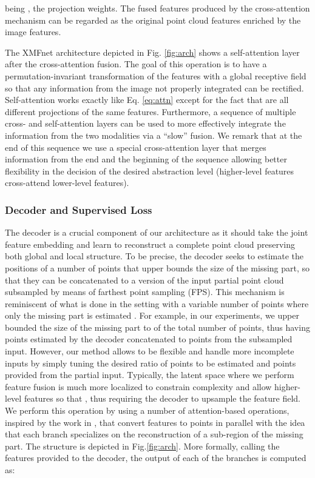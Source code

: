 \documentclass{article}
\begin{document}
being ,  the projection weights. The fused features  produced by the cross-attention mechanism can be regarded as the original point cloud features enriched by the image features.  

The XMFnet architecture depicted in Fig. \ref{fig:arch} shows a self-attention layer after the cross-attention fusion. The goal of this operation is to have a permutation-invariant transformation of the features with a global receptive field so that any information from the image not properly integrated can be rectified. Self-attention works exactly like Eq. \eqref{eq:attn} except for the fact that  are all different projections of the same features. Furthermore, a sequence of multiple cross- and self-attention layers can be used to more effectively integrate the information from the two modalities via a ``slow'' fusion. We remark that at the end of this sequence we use a special cross-attention layer that merges information from the end and the beginning of the sequence allowing better flexibility in the decision of the desired abstraction level (higher-level features cross-attend lower-level features). 



\subsubsection{Decoder and Supervised Loss}
The decoder is a crucial component of our architecture as it should take the joint feature embedding and learn to reconstruct a complete point cloud preserving both global and local structure. To be precise, the decoder seeks to estimate the positions of a number of points that upper bounds the size of the missing part, so that they can be concatenated to a version of the input partial point cloud subsampled by means of farthest point sampling (FPS). This mechanism is reminiscent of what is done in the setting with a variable number of points where only the missing part is estimated \cite{huang2020pf,alliegro2021denoise}. For example, in our experiments, we upper bounded the size of the missing part to  of the total number of points, thus having  points estimated by the decoder concatenated to  points from the subsampled input. However, our method allows to be flexible and handle more incomplete inputs by simply tuning the desired ratio of points to be estimated and points provided from the partial input.
Typically, the latent space where we perform feature fusion is much more localized to constrain complexity and allow higher-level features so that , thus requiring the decoder to upsample the feature field. We perform this operation by using a number of attention-based operations, inspired by the work in \cite{axform}, that convert features to points in parallel with the idea that each branch specializes on the reconstruction of a sub-region of the missing part. The structure is depicted in Fig.\ref{fig:arch}. More formally, calling  the features provided to the decoder, the output  of each of the  branches is computed as:
\end{document}
